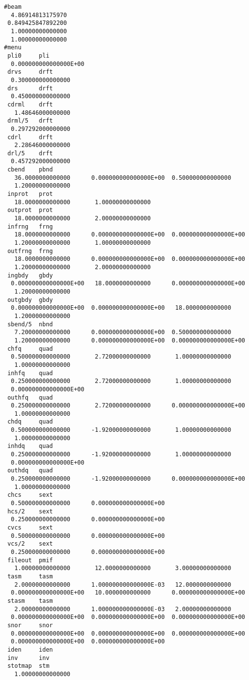 \begin{footnotesize}
\begin{verbatim}
#beam
  4.86914813175970
 0.849425847892200
  1.00000000000000
  1.00000000000000
#menu
 pli0     pli
  0.000000000000000E+00
 drvs     drft
  0.300000000000000
 drs      drft
  0.450000000000000
 cdrml    drft
   1.48646000000000
 drml/5   drft
  0.297292000000000
 cdrl     drft
   2.28646000000000
 drl/5    drft
  0.457292000000000
 cbend    pbnd
   36.0000000000000      0.000000000000000E+00  0.500000000000000
   1.20000000000000
 inprot   prot
   18.0000000000000       1.00000000000000
 outprot  prot
   18.0000000000000       2.00000000000000
 infrng   frng
   18.0000000000000      0.000000000000000E+00  0.000000000000000E+00
   1.20000000000000       1.00000000000000
 outfrng  frng
   18.0000000000000      0.000000000000000E+00  0.000000000000000E+00
   1.20000000000000       2.00000000000000
 ingbdy   gbdy
  0.000000000000000E+00   18.0000000000000      0.000000000000000E+00
   1.20000000000000
 outgbdy  gbdy
  0.000000000000000E+00  0.000000000000000E+00   18.0000000000000
   1.20000000000000
 sbend/5  nbnd
   7.20000000000000      0.000000000000000E+00  0.500000000000000
   1.20000000000000      0.000000000000000E+00  0.000000000000000E+00
 chfq     quad
  0.500000000000000       2.72000000000000       1.00000000000000
   1.00000000000000
 inhfq    quad
  0.250000000000000       2.72000000000000       1.00000000000000
  0.000000000000000E+00
 outhfq   quad
  0.250000000000000       2.72000000000000      0.000000000000000E+00
   1.00000000000000
 chdq     quad
  0.500000000000000      -1.92000000000000       1.00000000000000
   1.00000000000000
 inhdq    quad
  0.250000000000000      -1.92000000000000       1.00000000000000
  0.000000000000000E+00
 outhdq   quad
  0.250000000000000      -1.92000000000000      0.000000000000000E+00
   1.00000000000000
 chcs     sext
  0.500000000000000      0.000000000000000E+00
 hcs/2    sext
  0.250000000000000      0.000000000000000E+00
 cvcs     sext
  0.500000000000000      0.000000000000000E+00
 vcs/2    sext
  0.250000000000000      0.000000000000000E+00
 fileout  pmif
   1.00000000000000       12.0000000000000       3.00000000000000
 tasm     tasm
   2.00000000000000      1.000000000000000E-03   12.0000000000000
  0.000000000000000E+00   10.0000000000000      0.000000000000000E+00
 stasm    tasm
   2.00000000000000      1.000000000000000E-03   2.00000000000000
  0.000000000000000E+00  0.000000000000000E+00  0.000000000000000E+00
 snor     snor
  0.000000000000000E+00  0.000000000000000E+00  0.000000000000000E+00
  0.000000000000000E+00  0.000000000000000E+00
 iden     iden
 inv      inv
 stotmap  stm
   1.00000000000000

\end{verbatim}
\end{footnotesize}
